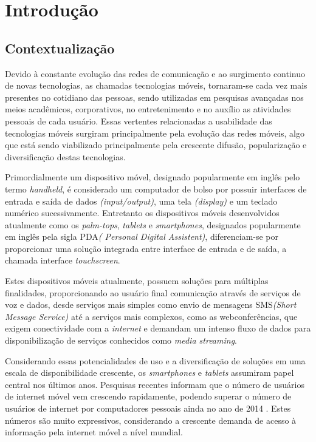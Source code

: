 \chapter{Introdução} %
\label{cha:chapter_name}

\section{Contextualização} %
\label{sec:contextualizacao}
Devido à constante evolução das redes de comunicação e ao surgimento continuo de
novas tecnologias, as chamadas tecnologias móveis, tornaram-se cada vez mais
presentes no cotidiano das pessoas, sendo utilizadas em pesquisas avançadas nos
meios acadêmicos, corporativos, no entretenimento e no auxílio as atividades
pessoais de cada usuário. Essas vertentes relacionadas a usabilidade
das tecnologias móveis surgiram principalmente pela evolução das redes
móveis, algo que está sendo viabilizado principalmente pela crescente difusão,
popularização e diversificação destas tecnologias.

Primordialmente um dispositivo móvel, designado popularmente em inglês pelo termo
\textit{handheld}, é considerado um computador de bolso por possuir interfaces
de entrada e saída de dados \textit{(input/output)}, uma tela \textit{(display)}
e um teclado numérico sucessivamente. Entretanto os dispositivos móveis
desenvolvidos atualmente como os \textit{palm-tops}, \textit{tablets} e
\textit{smartphones}, designados popularmente em inglês pela sigla PDA\textit{(
Personal Digital Assistent)}, diferenciam-se por proporcionar uma solução
integrada entre interface de entrada e de saída, a chamada interface
\textit{touchscreen}.

Estes dispositivos móveis atualmente, possuem soluções para múltiplas finalidades,
proporcionando ao usuário final comunicação através de serviços de voz e dados,
desde serviços mais simples como envio de mensagens SMS\textit{(Short Message
Service)} até a serviços mais complexos, como as webconferências, que exigem
conectividade com a \textit{internet} e demandam um intenso fluxo de dados para
disponibilização de serviços conhecidos como \textit{media streaming}.

Considerando essas potencialidades de uso e a diversificação de soluções em uma
escala de disponibilidade crescente, os \textit{smartphones} e \textit{tablets}
assumiram papel central nos últimos anos. Pesquisas recentes informam que o
número de usuários de internet móvel vem crescendo rapidamente, podendo superar
o número de usuários de internet por computadores pessoais ainda no ano de 2014
\cite{devitt2010meeker}. Estes números são muito expressivos, considerando a
crescente demanda de acesso à informação pela internet móvel a nível mundial.
